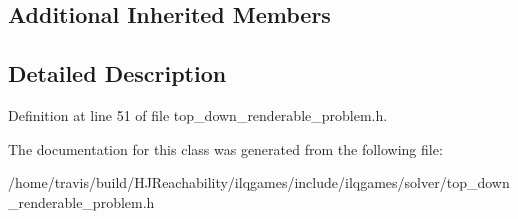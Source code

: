 \subsection*{Additional Inherited Members}


\subsection{Detailed Description}


Definition at line 51 of file top\+\_\+down\+\_\+renderable\+\_\+problem.\+h.



The documentation for this class was generated from the following file\+:\begin{DoxyCompactItemize}
\item 
/home/travis/build/\+H\+J\+Reachability/ilqgames/include/ilqgames/solver/top\+\_\+down\+\_\+renderable\+\_\+problem.\+h\end{DoxyCompactItemize}
